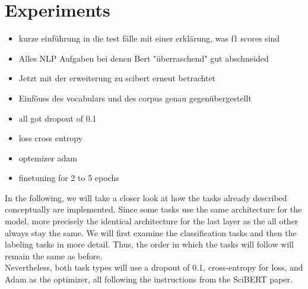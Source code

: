 \chapter{Experiments}
\label{chap:Experiments}
\color{ForestGreen}
\begin{itemize}
	\item kurze einführung in die test fälle mit einer erklärung, was f1 scores sind
	\item Alles NLP Aufgaben bei denen Bert "überraschend" gut abschneided
	\item Jetzt mit der erweiterung zu scibert erneut betrachtet
	\item Einföuss des vocabulars und des corpus genau gegenübergestellt
	\item all got dropout of 0.1
	\item loss cross entropy
	\item optemizer adam
	\item finetuning for 2 to 5 epochs 
\end{itemize}
\color{black}
In the following, we will take a closer look at how the tasks already described conceptually are implemented. Since some tasks use the same architecture for the model, more precisely the identical architecture for the last layer as the all other always stay the same. We will first examine the classification tasks and then the labeling tasks in more detail. Thus, the order in which the tasks will follow will remain the same as before.\\
Nevertheless, both task types will use a dropout of 0.1, cross-entropy for loss, and Adam as the optimizer, all following the instructions from the SciBERT paper.

\color{red}
